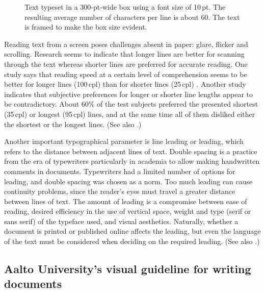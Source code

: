 \documentclass[english, 12pt, a4paper, biz, utf8, a-2b, online]{aaltothesis}
\begin{document}
\begin{figure}[b]
	\centering
	\caption{Text typeset in a 300-pt-wide box using a font size of 10\,pt. The 
		resulting average number of characters per line is about 60. The text is
		framed to make the box size evident.}
\end{figure}

Reading text from a screen poses challenges absent in paper: glare, flicker and 
scrolling. Research seems to indicate that longer lines are better for scanning 
through the text whereas shorter lines are preferred for accurate reading. One 
study says that reading speed at a certain level of comprehension seems to be 
better for longer lines (100\,cpl) than for shorter lines (25\,cpl) 
\cite{Dyson}. Another study \cite{Shaik} indicates that subjective preferences 
for longer or shorter line lengths appear to be contradictory. About 60\% of 
the test subjects preferred the presented shortest (35\,cpl) or longest 
(95\,cpl) lines, and at the same time all of them disliked either the 
shortest or the longest lines. (See also \cite{Wikilinelength}.)

Another important typographical parameter is line leading or leading, which 
refers to the distance between adjacent lines of text. Double spacing is a 
practice from the era of typewriters particularly in academia to allow making 
handwritten comments in documents. Typewriters had a limited number of options 
for leading, and double spacing was chosen as a norm. Too much leading can cause
continuity problems, since the reader’s eyes must travel a greater distance 
between lines of text. The amount of leading is a compromise between ease of 
reading, desired efficiency in the use of vertical space, weight and type (serif
or sans serif) of the typeface used, and visual aesthetics. Naturally, whether a
document is printed or published online affects the leading, but even the 
language of the text must be considered when deciding on the required leading. 
(See also \cite{enwiki:1026690618}.)

\subsection*{Aalto University’s visual guideline for writing documents}
\end{document}
